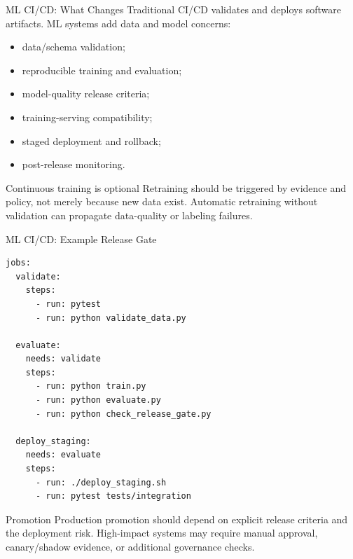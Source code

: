 \begin{frame}{ML CI/CD: What Changes}
Traditional CI/CD validates and deploys software artifacts. ML systems add data and model concerns:

\begin{itemize}
  \item data/schema validation;
  \item reproducible training and evaluation;
  \item model-quality release criteria;
  \item training-serving compatibility;
  \item staged deployment and rollback;
  \item post-release monitoring.
\end{itemize}

\begin{alertblock}{Continuous training is optional}
Retraining should be triggered by evidence and policy, not merely because new data exist. Automatic retraining without validation can propagate data-quality or labeling failures.
\end{alertblock}
\end{frame}

\begin{frame}[fragile]{ML CI/CD: Example Release Gate}
\begin{lstlisting}[style=code,basicstyle=\ttfamily\small]
jobs:
  validate:
    steps:
      - run: pytest
      - run: python validate_data.py

  evaluate:
    needs: validate
    steps:
      - run: python train.py
      - run: python evaluate.py
      - run: python check_release_gate.py

  deploy_staging:
    needs: evaluate
    steps:
      - run: ./deploy_staging.sh
      - run: pytest tests/integration
\end{lstlisting}

\begin{block}{Promotion}
Production promotion should depend on explicit release criteria and the deployment risk. High-impact systems may require manual approval, canary/shadow evidence, or additional governance checks.
\end{block}
\end{frame}


